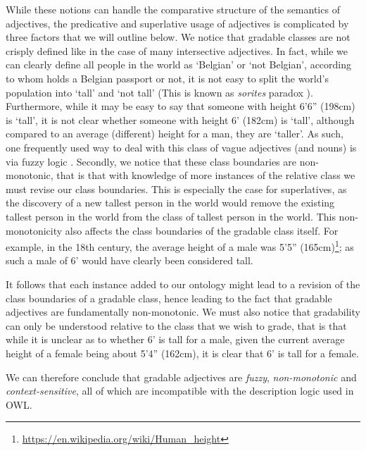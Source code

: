 \documentclass[11pt]{article}
\begin{document}
While these notions can handle the comparative structure of the semantics of adjectives, the 
predicative and superlative usage of adjectives is complicated by three factors
that we will outline below. We notice that gradable classes are not 
crisply defined like in the case of many intersective adjectives. In fact, while we can clearly define all people in the world as `Belgian' or 
`not Belgian', according to whom holds a Belgian passport or not, it is not easy to
split the world's population into `tall' and `not tall' (This is known as \emph{sorites} paradox \cite{Bennett06kr}).
Furthermore, while it may 
be easy to say that someone with height 6'6'' (198cm) is `tall', it is not clear 
whether someone with height 6' (182cm) is `tall', although compared to an average (different)
height for a man, they are `taller'.
As such, one frequently used way to deal with this class of vague adjectives (and nouns) is via fuzzy logic \cite{Goguen1969fuzzy,Zadeh1975fuzzy,Zadeh1965fuzzy,DuboisPrade88en,Bennett06kr}.
Secondly, we notice that these class boundaries are 
non-monotonic, that is that with knowledge of more instances of the relative 
class we must revise our class boundaries. This is especially the case for superlatives, as the discovery of a new tallest person in the world would remove 
the existing tallest person in the world from the class of tallest person in the 
world. This non-monotonicity also affects the class boundaries of the gradable 
class itself. For example, in the 18th century, the average height of a male was 
5'5'' (165cm)\footnote{\url{https://en.wikipedia.org/wiki/Human_height}}; as such a male of 6' would have clearly been considered tall. 

It follows that each instance added to our ontology might lead to a revision of the class boundaries of a gradable class, hence leading to the fact that 
gradable adjectives are fundamentally non-monotonic. We must also notice 
that gradability can only be understood relative to the class that we wish to 
grade, that is that while it is unclear as to whether 6' is tall for a male, 
given the current average height of a female being about 5'4'' (162cm), it is clear 
that 6' is tall for a female.

We can therefore conclude that gradable adjectives are \emph{fuzzy}, \emph{non-monotonic} 
and \emph{context-sensitive}, all of which are incompatible with the description 
logic used in OWL.
\end{document}
